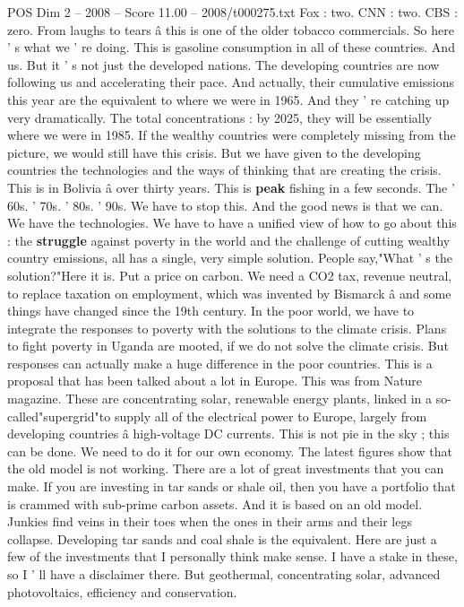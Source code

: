 \begin{textsample}{POS Dim 2 – 2008 – Score 11.00 – 2008/t000275.txt}
Fox : two.
CNN : two.
CBS : zero.
From laughs to tears â this is one of the older tobacco commercials.
So here ' s what we ' re doing.
This is gasoline consumption in all of these countries.
And us.
But it ' s not just the developed nations.
The developing countries are now following us and accelerating their pace.
And actually, their cumulative emissions this year are the equivalent to where we were in 1965.
And they ' re catching up very dramatically.
The total concentrations : by 2025, they will be essentially where we were in 1985.
If the wealthy countries were completely missing from the picture, we would still have this crisis.
But we have given to the developing countries the technologies and the ways of thinking that are creating the crisis.
This is in Bolivia â over thirty years.
This is \textbf{peak} fishing in a few seconds.
The ' 60s. ' 70s. ' 80s. ' 90s.
We have to stop this.
And the good news is that we can.
We have the technologies.
We have to have a unified view of how to go about this : the \textbf{struggle} against poverty in the world and the challenge of cutting wealthy country emissions, all has a single, very simple solution.
People say,"What ' s the solution?"Here it is.
Put a price on carbon.
We need a CO2 tax, revenue neutral, to replace taxation on employment, which was invented by Bismarck â and some things have changed since the 19th century.
In the poor world, we have to integrate the responses to poverty with the solutions to the climate crisis.
Plans to fight poverty in Uganda are mooted, if we do not solve the climate crisis.
But responses can actually make a huge difference in the poor countries.
This is a proposal that has been talked about a lot in Europe.
This was from Nature magazine.
These are concentrating solar, renewable energy plants, linked in a so-called"supergrid"to supply all of the electrical power to Europe, largely from developing countries â high-voltage DC currents.
This is not pie in the sky ; this can be done.
We need to do it for our own economy.
The latest figures show that the old model is not working.
There are a lot of great investments that you can make.
If you are investing in tar sands or shale oil, then you have a portfolio that is crammed with sub-prime carbon assets.
And it is based on an old model.
Junkies find veins in their toes when the ones in their arms and their legs collapse.
Developing tar sands and coal shale is the equivalent.
Here are just a few of the investments that I personally think make sense.
I have a stake in these, so I ' ll have a disclaimer there.
But geothermal, concentrating solar, advanced photovoltaics, efficiency and conservation.

\end{textsample}
